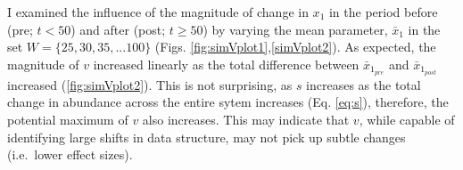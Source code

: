 \documentclass[12pt,twoside,openany]{reedthesis}
\newenvironment{Shaded}{\begin{snugshade}}{\end{snugshade}}
\newcommand{\DataTypeTok}[1]{\textcolor[rgb]{0.13,0.29,0.53}{#1}}
\newcommand{\DecValTok}[1]{\textcolor[rgb]{0.00,0.00,0.81}{#1}}
\newcommand{\KeywordTok}[1]{\textcolor[rgb]{0.13,0.29,0.53}{\textbf{#1}}}
\newcommand{\NormalTok}[1]{#1}
\newcommand{\OperatorTok}[1]{\textcolor[rgb]{0.81,0.36,0.00}{\textbf{#1}}}
\newcommand{\StringTok}[1]{\textcolor[rgb]{0.31,0.60,0.02}{#1}}
\begin{document}
I examined the influence of the magnitude of change in \(x_1\) in the period before (pre; \(t <50\)) and after (post; \(t \geq 50\)) by varying the mean parameter, \(\bar{x}_1\) in the set \(W=\{25,30,35,...100 \}\) (Figs. \ref{fig:simVplot1},\ref{simVplot2}). As expected, the magnitude of \(v\) increased linearly as the total difference between \(\bar{x}_{1_{pre}}\) and \(\bar{x}_{1_{post}}\) increased (\ref{fig:simVplot2}). This is not surprising, as \(s\) increases as the total change in abundance across the entire sytem increases (Eq. \eqref{eq:s}), therefore, the potential maximum of \(v\) also increases. This may indicate that \(v\), while capable of identifying large shifts in data structure, may not pick up subtle changes (i.e.~lower effect sizes).
\begin{Shaded}
\end{Shaded}
\end{document}
